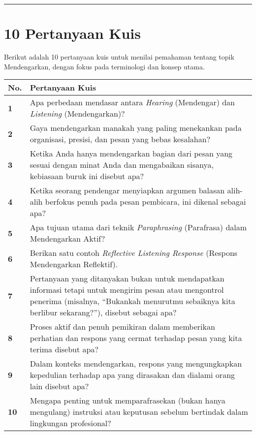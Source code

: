 \documentclass[
  letterpaper,
  DIV=11,
  numbers=noendperiod]{scrreprt}
\begin{document}
\begin{center}\rule{0.5\linewidth}{0.5pt}\end{center}

\section{10 Pertanyaan Kuis}\label{pertanyaan-kuis}

Berikut adalah 10 pertanyaan kuis untuk menilai pemahaman tentang topik
Mendengarkan, dengan fokus pada terminologi dan konsep utama.

\begin{longtable}[]{@{}
  >{\centering\arraybackslash}p{}
  >{\raggedright\arraybackslash}p{}@{}}
\toprule\noalign{}
\begin{minipage}[b]{\linewidth}\centering
No.
\end{minipage} & \begin{minipage}[b]{\linewidth}\raggedright
Pertanyaan Kuis
\end{minipage} \\
\midrule\noalign{}
\endhead
\bottomrule\noalign{}
\endlastfoot
\textbf{1} & Apa perbedaan mendasar antara \emph{Hearing} (Mendengar)
dan \emph{Listening} (Mendengarkan)? \\
\textbf{2} & Gaya mendengarkan manakah yang paling menekankan pada
organisasi, presisi, dan pesan yang bebas kesalahan? \\
\textbf{3} & Ketika Anda hanya mendengarkan bagian dari pesan yang
sesuai dengan minat Anda dan mengabaikan sisanya, kebiasaan buruk ini
disebut apa? \\
\textbf{4} & Ketika seorang pendengar menyiapkan argumen balasan
alih-alih berfokus penuh pada pesan pembicara, ini dikenal sebagai
apa? \\
\textbf{5} & Apa tujuan utama dari teknik \emph{Paraphrasing}
(Parafrasa) dalam Mendengarkan Aktif? \\
\textbf{6} & Berikan satu contoh \emph{Reflective Listening Response}
(Respons Mendengarkan Reflektif). \\
\textbf{7} & Pertanyaan yang ditanyakan bukan untuk mendapatkan
informasi tetapi untuk mengirim pesan atau mengontrol penerima
(misalnya, ``Bukankah menurutmu sebaiknya kita berlibur sekarang?''),
disebut sebagai apa? \\
\textbf{8} & Proses aktif dan penuh pemikiran dalam memberikan perhatian
dan respons yang cermat terhadap pesan yang kita terima disebut apa? \\
\textbf{9} & Dalam konteks mendengarkan, respons yang mengungkapkan
kepedulian terhadap apa yang dirasakan dan dialami orang lain disebut
apa? \\
\textbf{10} & Mengapa penting untuk memparafrasekan (bukan hanya
mengulang) instruksi atau keputusan sebelum bertindak dalam lingkungan
profesional? \\
\end{longtable}
\end{document}
